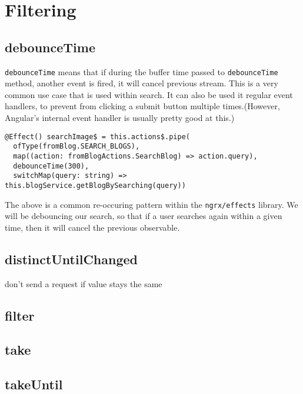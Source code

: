 \chapter{Filtering}

\section{debounceTime}
\lstinline{debounceTime} means that if during the buffer time passed to 
\lstinline{debounceTime} method, another event is fired, it will cancel 
previous stream. This is a very common use case that is used within search.
It can also be used it regular event handlers, to prevent from clicking a 
submit button multiple times.(However, Angular's internal event handler 
is usually pretty good at this.)


\begin{lstlisting}[caption=blog.effects.ts]
@Effect() searchImage$ = this.actions$.pipe(
  ofType(fromBlog.SEARCH_BLOGS),
  map((action: fromBlogActions.SearchBlog) => action.query),
  debounceTime(300),
  switchMap(query: string) => this.blogService.getBlogBySearching(query))
\end{lstlisting}

The above is a common re-occuring pattern within the \lstinline{ngrx/effects}
library. We will be debouncing our search, so that if a user searches again 
within a given time, then it will cancel the previous observable. 


\section{distinctUntilChanged} 
don't send a request if value stays the same 

\section{filter} 

\section{take} 

\section{takeUntil}